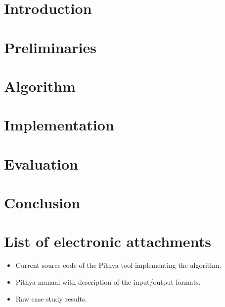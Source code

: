 






\chapter{Introduction}
\label{chap:intro}


\chapter{Preliminaries}
\label{chap:preliminaries}


\chapter{Algorithm}
\label{chap:algorithm}


\chapter{Implementation}
\label{chap:implementation}


\chapter{Evaluation}
\label{chap:evaluation}


\chapter{Conclusion}
\label{chap:conclusions}


\printbibliography[heading=bibintoc] %

%  
%

\appendix
\chapter{List of electronic attachments}
\begin{itemize}
	\item Current source code of the Pithya tool implementing the algorithm.
	\item Pithya manual with description of the input/output formats.
	\item Raw case study results.
\end{itemize}



